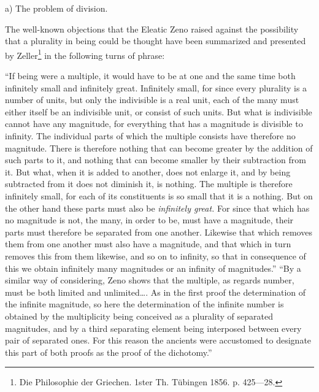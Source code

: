 \documentclass[12pt,a4paper,openany]{book}
\newcommand{\opage}[1]{\marginnote{\footnotesize\textit{[#1]}}}
\begin{document}
\begin{center}a) The problem of division.\end{center}

The well-known objections that the Eleatic Zeno raised against
the possibility that a plurality in being could be
thought have been summarized and presented by Zeller\footnote[1]{Die Philosophie der Griechen. 1ster Th. Tübingen 1856. p. 425—28.} in the following
turns of phrase:

``If being were a multiple, it would have
to be at one and the same time both infinitely small and infinitely
great. Infinitely small, for since every plurality is a number
of units, but only the indivisible is a real unit,
each of the many must either itself be an indivisible
unit, or consist of such units. But what
is indivisible cannot have any magnitude, for everything that
has a magnitude is divisible to infinity. The individual
parts of which the multiple consists have therefore
no magnitude. There is therefore nothing that can become greater
by the addition of such parts to it, and nothing that can become
smaller by their subtraction from it. But what, when
it is added to another, does not enlarge it, and by being
subtracted from it does not diminish it, is nothing. The multiple
is therefore infinitely small, for each of its constituents
is so small that it is a nothing. But on the other
hand these parts must also be \emph{infinitely great.} For since
that which has no magnitude is not, the many, in order
to be, must have a magnitude, their parts must therefore
be separated from one another. Likewise that which
removes them from one another must also have a magnitude, and that which
in turn removes this from them likewise, and so on
to infinity, so that in consequence of this we obtain infinitely many
magnitudes or an infinity of magnitudes.'' ``By a
similar way of considering, Zeno shows that the multiple, as regards number, must be both limited and
\setcounter{footnote}{0}%
\opage{117}unlimited\dots{}. As in the first proof the determination
of the infinite magnitude, so here the determination
of the infinite number is obtained by the multiplicity
being conceived as a plurality of separated magnitudes, and by a third
separating element being interposed
between every pair of separated ones.
For this reason the ancients were accustomed to designate this part of both
proofs as the proof of the dichotomy.''
\end{document}
